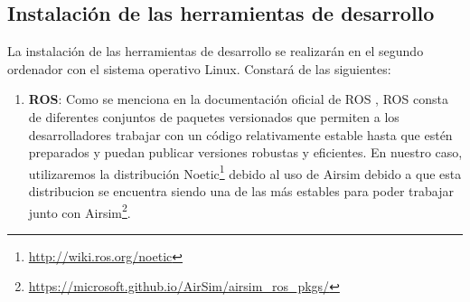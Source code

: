  \subsection{Instalación de las herramientas de desarrollo}
  \label{subsec:Instalación de las herramientas de desarrollo}
  La instalación de las herramientas de desarrollo se realizarán en el segundo ordenador con el sistema operativo Linux. Constará de las 
  siguientes:
  \begin{enumerate}
    \item \textbf{ROS}: Como se menciona en la documentación oficial de ROS \cite{roswiki} , ROS consta de diferentes conjuntos de paquetes versionados que permiten a los desarrolladores
    trabajar con un código relativamente estable hasta que estén preparados y puedan publicar versiones robustas y eficientes. En nuestro caso, utilizaremos la distribución Noetic\footnote{\url{http://wiki.ros.org/noetic}}
    debido al uso de Airsim debido a que esta distribucion se encuentra siendo una de las más estables para poder trabajar junto con Airsim\footnote{\url{https://microsoft.github.io/AirSim/airsim_ros_pkgs/}}. 


\end{enumerate}
